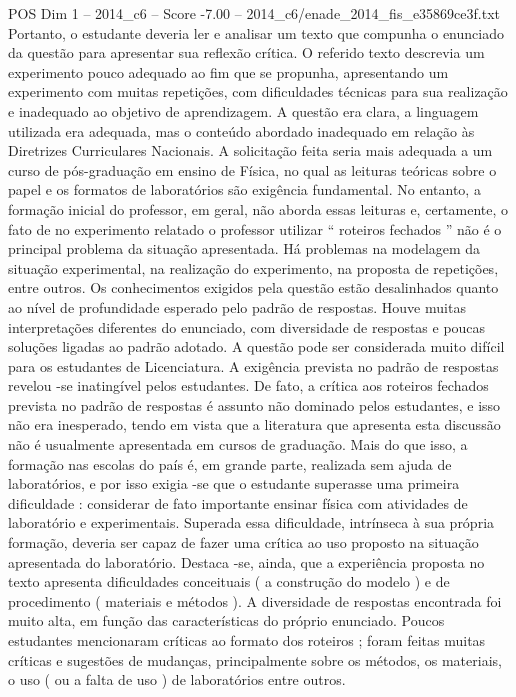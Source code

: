 \begin{textsample}{POS Dim 1 – 2014\_c6 – Score -7.00 – 2014\_c6/enade\_2014\_fis\_e35869ce3f.txt}
Portanto, o estudante deveria ler e analisar um texto que compunha o enunciado da questão para apresentar sua reflexão crítica.
O referido texto descrevia um experimento pouco adequado ao fim que se propunha, apresentando um experimento com muitas repetições, com dificuldades técnicas para sua realização e inadequado ao objetivo de aprendizagem.
A questão era clara, a linguagem utilizada era adequada, mas o conteúdo abordado inadequado em relação às Diretrizes Curriculares Nacionais.
A solicitação feita seria mais adequada a um curso de pós-graduação em ensino de Física, no qual as leituras teóricas sobre o papel e os formatos de laboratórios são exigência fundamental.
No entanto, a formação inicial do professor, em geral, não aborda essas leituras e, certamente, o fato de no experimento relatado o professor utilizar “ roteiros fechados ” não é o principal problema da situação apresentada.
Há problemas na modelagem da situação experimental, na realização do experimento, na proposta de repetições, entre outros.
Os conhecimentos exigidos pela questão estão desalinhados quanto ao nível de profundidade esperado pelo padrão de respostas.
Houve muitas interpretações diferentes do enunciado, com diversidade de respostas e poucas soluções ligadas ao padrão adotado.
A questão pode ser considerada muito difícil para os estudantes de Licenciatura.
A exigência prevista no padrão de respostas revelou -se inatingível pelos estudantes.
De fato, a crítica aos roteiros fechados prevista no padrão de respostas é assunto não dominado pelos estudantes, e isso não era inesperado, tendo em vista que a literatura que apresenta esta discussão não é usualmente apresentada em cursos de graduação.
Mais do que isso, a formação nas escolas do país é, em grande parte, realizada sem ajuda de laboratórios, e por isso exigia -se que o estudante superasse uma primeira dificuldade : considerar de fato importante ensinar física com atividades de laboratório e experimentais.
Superada essa dificuldade, intrínseca à sua própria formação, deveria ser capaz de fazer uma crítica ao uso proposto na situação apresentada do laboratório.
Destaca -se, ainda, que a experiência proposta no texto apresenta dificuldades conceituais ( a construção do modelo ) e de procedimento ( materiais e métodos ).
A diversidade de respostas encontrada foi muito alta, em função das características do próprio enunciado.
Poucos estudantes mencionaram críticas ao formato dos roteiros ; foram feitas muitas críticas e sugestões de mudanças, principalmente sobre os métodos, os materiais, o uso ( ou a falta de uso ) de laboratórios entre outros.

\end{textsample}
